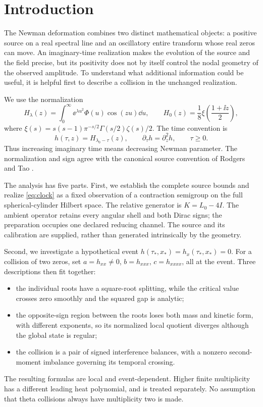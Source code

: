\section{Introduction}\label{sec:intro}

The Newman deformation combines two distinct mathematical objects: a
positive source on a real spectral line and an oscillatory entire
transform whose real zeros can move. An imaginary-time realization makes
the evolution of the source and the field precise, but its positivity
does not by itself control the nodal geometry of the observed amplitude.
To understand what additional information could be useful, it is helpful
first to describe a collision in the unchanged realization.

We use the normalization
\begin{equation}\label{eq:intro-H}
 H_\lambda(z)=\int_0^\infty \ee^{\lambda u^2}\Phi(u)\cos(zu)\dd u,
 \qquad H_0(z)=\frac18\xi\!\left(\frac{1+\ii z}{2}\right),
\end{equation}
where \(\xi(s)=s(s-1)\pi^{-s/2}\Gamma(s/2)\zeta(s)/2\).
The time convention is
\begin{equation}\label{eq:clock}
 h(\tau,z)=H_{\lambda_0-\tau}(z),\qquad
 \partial_\tau h=\partial_z^2h,\qquad \tau\geq0.
\end{equation}
Thus increasing imaginary time means decreasing Newman parameter.
The normalization and sign agree with the canonical source convention of
Rodgers and Tao \cite{RodgersTao2020}.

The analysis has five parts. First, we establish the complete source bounds
and realize \eqref{eq:clock} as a fixed observation of a contraction
semigroup on the full spherical-cylinder Hilbert space. The relative
generator is \(K=L_0-4I\). The ambient operator retains every angular shell
and both Dirac signs; the preparation occupies one declared reducing
channel. The source and its calibration are supplied, rather than
generated intrinsically by the geometry.

Second, we investigate a hypothetical event
\(h(\tau_*,x_*)=h_x(\tau_*,x_*)=0\). For a collision of two zeros, set
\(a=h_{xx}\ne0\), \(b=h_{xxx}\), \(c=h_{xxxx}\), all at the event.
Three descriptions then fit together:
\begin{itemize}
\item the individual roots have a square-root splitting, while the
critical value crosses zero smoothly and the squared gap is analytic;
\item the opposite-sign region between the roots loses both mass and
kinetic form, with different exponents, so its normalized local quotient
diverges although the global state is regular;
\item the collision is a pair of signed interference balances, with a
nonzero second-moment imbalance governing its temporal crossing.
\end{itemize}
The resulting formulas are local and event-dependent. Higher finite
multiplicity has a different leading heat polynomial, and is treated
separately. No assumption that theta collisions always have multiplicity two is made.

